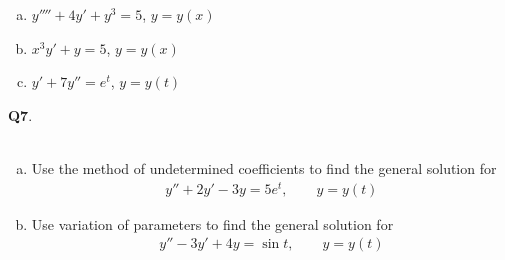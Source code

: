\documentclass[12pt, oneside]{amsart}
\begin{document}
\vspace{1in}
\begin{enumerate}[a)]
    \item
        $y'''' + 4y' + y^{3} = 5$, \quad $y = y(x)$
        \vspace{2in}

    \item
        $x^3y' + y = 5$, \quad $y = y(x)$
        \vspace{2in}

    \item 
        $y' + 7y'' = e^t$, \quad $y = y(t)$
        \vspace{2in}
\end{enumerate}
\newpage
\noindent
\textbf{Q7}. \\ \\ 
\begin{enumerate}[a)]
	\item
Use the method of undetermined coefficients to find the
general solution for
\begin{align*}
y'' + 2y' -3y = 5e^t, \qquad y = y(t)
\end{align*}
\vspace{3in}
\item

Use variation of parameters to find the general solution for
\begin{align*}
y'' -3y' + 4y = \sin t, \qquad y = y(t)
\end{align*}
\end{enumerate}
\end{document}

